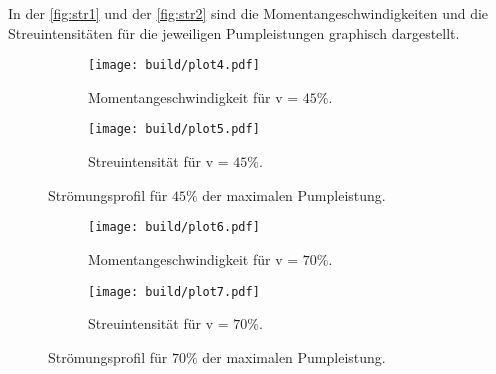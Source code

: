 In der \autoref{fig:str1} und der \autoref{fig:str2} sind die Momentangeschwindigkeiten und die Streuintensitäten für die jeweiligen
Pumpleistungen graphisch dargestellt.


\begin{figure}
  \begin{subfigure}{0.48\textwidth}
    \centering
    \texttt{[image: build/plot4.pdf]}
    \caption{Momentangeschwindigkeit für v = $45\%$.}
    \label{fig:plot4}
  \end{subfigure}
  \hfill
  \begin{subfigure}{0.48\textwidth}
    \centering
    \texttt{[image: build/plot5.pdf]}
    \caption{Streuintensität für v = $45\%$.}
    \label{fig:plot5}
  \end{subfigure}
  \caption{Strömungsprofil für $45\%$ der maximalen Pumpleistung.}
  \label{fig:str1}
\end{figure}

\begin{figure}
  \begin{subfigure}{0.48\textwidth}
    \centering
    \texttt{[image: build/plot6.pdf]}
    \caption{Momentangeschwindigkeit für v = $70\%$.}
    \label{fig:plot6}
  \end{subfigure}
  \hfill
  \begin{subfigure}{0.48\textwidth}
    \centering
    \texttt{[image: build/plot7.pdf]}
    \caption{Streuintensität für v = $70\%$.}
    \label{fig:plot7}
  \end{subfigure}
  \caption{Strömungsprofil für $70\%$ der maximalen Pumpleistung.}
  \label{fig:str2}
\end{figure}
